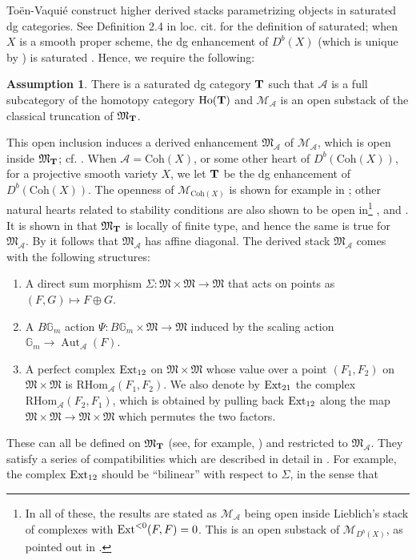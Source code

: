 \documentclass[12pt]{amsart}
\theoremstyle{definition}
\newtheorem{assumption}[definition]{Assumption}
\newcommand{\BG}{{\mathbb{G}}}
\newcommand{\CA}{{\mathcal A}}
\newcommand{\CM}{{\mathcal M}}
\newcommand{\1}{\mathbf 1}
\newcommand{\bfT}{{\bf T}}
\newcommand{\FM}{{\mathfrak{M}}}
\DeclareMathOperator{\Aut}{Aut}
\newcommand{\Ext}{\mathcal{E}\text{xt}}
\newcommand{\Coh}{\mathrm{Coh}}
\newcommand{\RHom}{\mathrm{RHom}}
\renewcommand{\Ext}{\textup{Ext}}
\begin{document}
Toën-Vaquié \cite{TV07} construct higher derived stacks parametrizing objects in saturated dg categories. See Definition 2.4 in loc. cit. for the definition of saturated; when $X$ is a smooth proper scheme, the dg enhancement of $D^b(X)$ (which is unique by \cite[Corollary 7.2]{CSdgenhancement}) is saturated \cite[Lemma 3.27]{TV07}. Hence, we require the following:
\begin{assumption}\label{ass: good2}
    There is a saturated dg category $\bfT$ such that $\CA$ is a full subcategory of the homotopy category $\textup{Ho}(\bfT)$ and $\CM_\CA$ is an open substack of the classical truncation of $\FM_{\bfT}$.
\end{assumption}
This open inclusion induces a derived enhancement $\FM_\CA$ of $\CM_\CA$, which is open inside $\FM_{\bfT}$; cf. \cite[Proposition 2.1]{STV}. When $\CA=\Coh(X)$, or some other heart of $D^b(\Coh(X))$, for a projective smooth variety $X$, we let $\bfT$ be the dg enhancement of $D^b(\Coh(X))$. The openness of $\CM_{\Coh(X)}$ is shown for example in \cite[Proposition 6.2.7]{HLstructure}; other natural hearts related to stability conditions are also shown to be open in\footnote{In all of these, the results are stated as $\CM_\CA$ being open inside Lieblich's \cite{lieblich} stack of complexes with $\Ext^{<0}(F, F)=0$. This is an open substack of $\CM_{D^b(X)}$, as pointed out in \cite[Corollary 3.21]{TV07}.} \cite[Section 4]{PiyToda}, \cite[Proposition 6.2.7]{HLstructure} and \cite[Proposition 4.6]{BCR}. It is shown in \cite[Theorem 0.2]{TV07} that $\FM_{\bfT}$ is locally of finite type, and hence the same is true for $\FM_\CA$. By \cite[Lemma 7.20]{AHLH} it follows that $\FM_\CA$ has affine diagonal. The derived stack $\FM_\CA$ comes with the following structures:
\begin{enumerate}
    \item A direct sum morphism $\Sigma\colon \FM\times \FM\to \FM$ that acts on points as $(F, G)\mapsto F\oplus G$.
    \item A $B\BG_m$ action $\Psi\colon B\BG_m\times \FM\to \FM$ induced by the scaling action $\BG_m\rightarrow \Aut_{\CA}(F)$.
    \item A perfect complex $\Ext_{12}$ on $\FM\times \FM$ whose value over a point $(F_1, F_2)$ on $\FM\times \FM$ is $\RHom_\CA(F_1, F_2)$. We also denote by $\Ext_{21}$ the complex $\RHom_\CA(F_2, F_1)$, which is obtained by pulling back $\Ext_{12}$ along the map $\FM\times \FM\to \FM\times \FM$ which permutes the two factors.
\end{enumerate}
These can all be defined on $\FM_\bfT$ (see, for example, \cite[Proposition 8.29]{KPS}) and restricted to $\FM_\CA$. They satisfy a series of compatibilities which are described in detail in \cite[Assumption 4.4 (c), (f)]{joyce}. For example, the complex $\Ext_{12}$ should be ``bilinear'' with respect to $\Sigma$, in the sense that
\end{document}

